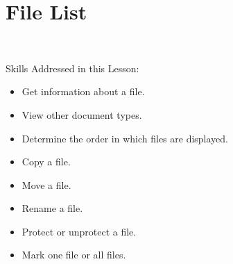 \documentclass[10pt,letterpaper,twoside]{report}
\begin{document}
{{{%
\clearpage

\section{ File List}
\

Skills Addressed in this Lesson:
\begin{itemize}
	\item Get information about a file.
	\item View other document types.
	\item Determine the order in which files are displayed.
	\item Copy a file.
	\item Move a file.
	\item Rename a file.
	\item Protect or unprotect a file.
	\item Mark one file or all files.
\end{itemize}
}}}
\end{document}
